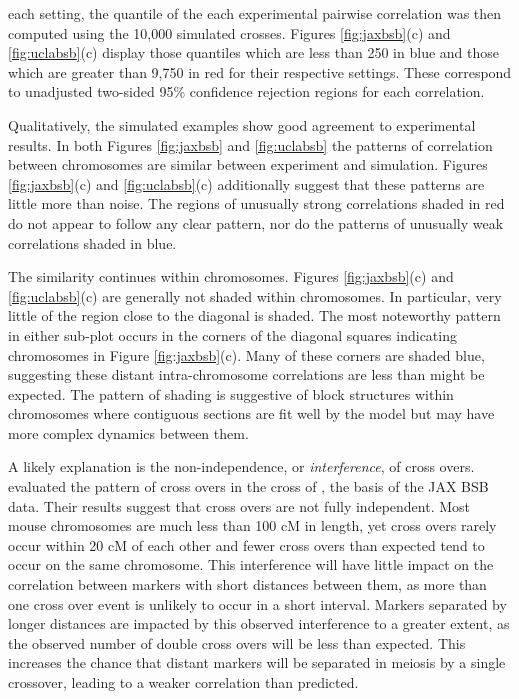 \documentclass[12pt]{article}
\begin{document}
each setting, the quantile of the each experimental pairwise correlation was then computed using the 10,000 simulated crosses. Figures \ref{fig:jaxbsb}(c) and \ref{fig:uclabsb}(c) display those quantiles which are less than 250 in blue and those which are greater than 9,750 in red for their respective settings. These correspond to unadjusted two-sided 95\% confidence rejection regions for each correlation.

Qualitatively, the simulated examples show good agreement to experimental results. In both Figures \ref{fig:jaxbsb} and \ref{fig:uclabsb} the patterns of correlation between chromosomes are similar between experiment and simulation. Figures \ref{fig:jaxbsb}(c) and \ref{fig:uclabsb}(c) additionally suggest that these patterns are little more than noise. The regions of unusually strong correlations shaded in red do not appear to follow any clear pattern, nor do the patterns of unusually weak correlations shaded in blue.

The similarity continues within chromosomes. Figures \ref{fig:jaxbsb}(c) and \ref{fig:uclabsb}(c) are generally not shaded within chromosomes. In particular, very little of the region close to the diagonal is shaded. The most noteworthy pattern in either sub-plot occurs in the corners of the diagonal squares indicating chromosomes in Figure \ref{fig:jaxbsb}(c). Many of these corners are shaded blue, suggesting these distant intra-chromosome correlations are less than might be expected. The pattern of shading is suggestive of block structures within chromosomes where contiguous sections are fit well by the model but may have more complex dynamics between them. 

A likely explanation is the non-independence, or \emph{interference}, of cross overs. \cite{bromanetal2002crossover} evaluated the pattern of cross overs in the cross of \cite{roweetal1994jaxbsb}, the basis of the JAX BSB data. Their results suggest that cross overs are not fully independent. Most mouse chromosomes are much less than 100 cM in length, yet cross overs rarely occur within 20 cM of each other and fewer cross overs than expected tend to occur on the same chromosome. This interference will have little impact on the correlation between markers with short distances between them, as more than one cross over event is unlikely to occur in a short interval. Markers separated by longer distances are impacted by this observed interference to a greater extent, as the observed number of double cross overs will be less than expected. This increases the chance that distant markers will be separated in meiosis by a single crossover, leading to a weaker correlation than predicted.
\end{document}
